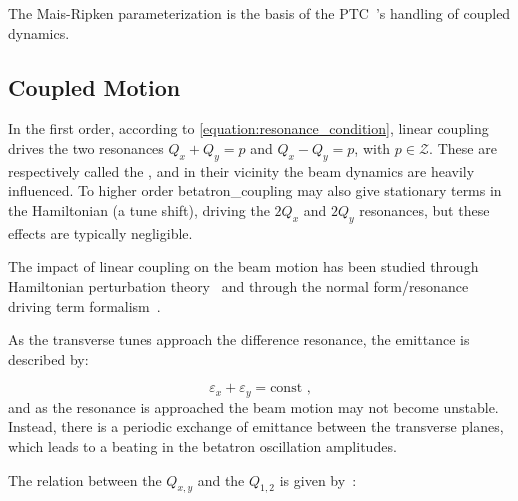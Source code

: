 The Mais-Ripken parameterization is the basis of the \gls{PTC}~\cite{CODE:Schmidt_Forest:PTC}'s handling of coupled dynamics. 

\subsection{Coupled Motion}
\label{subsection:coupled_motion}

In the first order, according to \cref{equation:resonance_condition}, linear coupling drives the two resonances \(Q_x + Q_y = p\) and \(Q_x - Q_y = p\), with \(p \in \mathcal{Z}\).
These are respectively called the , and in their vicinity the beam dynamics are heavily influenced.
To higher order \gls{betatron_coupling} may also give stationary terms in the Hamiltonian (a tune shift), driving the \(2 Q_x\) and \(2 Q_y\) resonances, but these effects are typically negligible.

The impact of linear coupling on the beam motion has been studied through Hamiltonian perturbation theory~\cite{PHREV:Guignard:Betatron_Coupling_Radiation,BOOK:Wiedemann:Particle_Accelerator_Physics} and through the normal form/resonance driving term formalism~\cite{PHD:Franchi}.

As the transverse tunes approach the difference resonance, the emittance is described by:

\begin{equation}
    \varepsilon_x + \varepsilon_y = \mathrm{const} \text{ ,}
    \label{equation:coupled_emittances_difference_resonance}
\end{equation}
and as the resonance is approached the beam motion may not become unstable.
Instead, there is a periodic exchange of emittance between the transverse planes, which leads to a beating in the betatron oscillation amplitudes.

The relation between the  \(Q_{x,y}\) and the  \(Q_{1,2}\) is given by~\cite{CAS:Bryant:Theory_Weak_Betatron_Coupling}:

